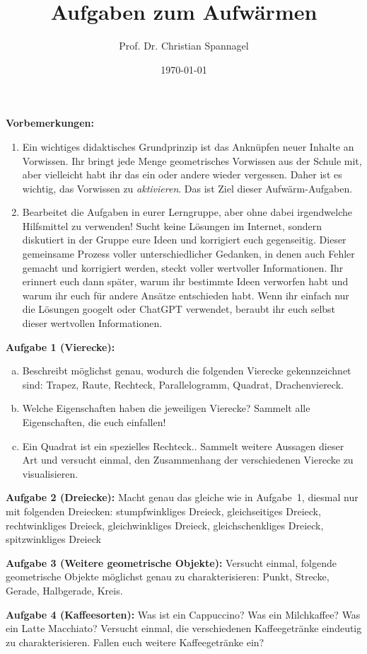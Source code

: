 \documentclass{../cssheet}
\title{Aufgaben zum Aufwärmen}
\author{Prof. Dr. Christian Spannagel}
\date{\today}
\begin{document}
\printtitle

\textbf{Vorbemerkungen:} 
\begin{enumerate}
\item Ein wichtiges didaktisches Grundprinzip ist das Anknüpfen neuer Inhalte an Vorwissen. Ihr bringt jede Menge geometrisches Vorwissen aus der Schule mit, aber vielleicht habt ihr das ein oder andere wieder vergessen. Daher ist es wichtig, das Vorwissen zu \emph{aktivieren}. Das ist Ziel dieser Aufwärm-Aufgaben.
\item Bearbeitet die Aufgaben in eurer Lerngruppe, aber ohne dabei irgendwelche Hilfsmittel zu verwenden! Sucht keine Lösungen im Internet, sondern diskutiert in der Gruppe eure Ideen und korrigiert euch gegenseitig. Dieser gemeinsame Prozess voller unterschiedlicher Gedanken, in denen auch Fehler gemacht und korrigiert werden, steckt voller wertvoller Informationen. Ihr erinnert euch dann später, warum ihr bestimmte Ideen verworfen habt und warum ihr euch für andere Ansätze entschieden habt. Wenn ihr einfach nur die Lösungen googelt oder ChatGPT verwendet, beraubt ihr euch selbst dieser wertvollen Informationen.
\end{enumerate}


\textbf{Aufgabe 1 (Vierecke):}  
\begin{enumerate}[a)]
\item Beschreibt möglichst genau, wodurch die folgenden Vierecke gekennzeichnet sind: Trapez, Raute, Rechteck, Parallelogramm, Quadrat, Drachenviereck.
\item Welche Eigenschaften haben die jeweiligen Vierecke? Sammelt alle Eigenschaften, die euch einfallen!
\item \glqq{}Ein Quadrat ist ein spezielles Rechteck.\grqq{}. Sammelt weitere Aussagen dieser Art und versucht einmal, den Zusammenhang der verschiedenen Vierecke zu visualisieren.
\end{enumerate}

\textbf{Aufgabe 2 (Dreiecke):} Macht genau das gleiche wie in Aufgabe~1, diesmal nur mit folgenden Dreiecken: stumpfwinkliges Dreieck, gleichseitiges Dreieck, rechtwinkliges Dreieck, gleichwinkliges Dreieck, gleichschenkliges Dreieck, spitzwinkliges Dreieck

\textbf{Aufgabe 3 (Weitere geometrische Objekte):} Versucht einmal, folgende geometrische Objekte möglichst genau zu charakterisieren: Punkt, Strecke, Gerade, Halbgerade, Kreis.

\textbf{Aufgabe 4 (Kaffeesorten):} Was ist ein Cappuccino? Was ein Milchkaffee? Was ein Latte Macchiato? Versucht einmal, die verschiedenen Kaffeegetränke eindeutig zu charakterisieren. Fallen euch weitere Kaffeegetränke ein?


\vspace*{10mm}
\printlicense

\printsocials


\end{document}

